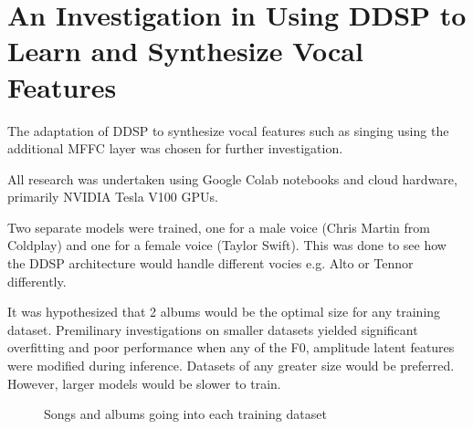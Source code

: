 \chapter{An Investigation in Using DDSP to Learn and Synthesize Vocal Features}

The adaptation of DDSP to synthesize vocal features such as singing using the additional MFFC layer was chosen for further investigation.

All research was undertaken using Google Colab notebooks and cloud hardware, primarily NVIDIA Tesla V100 GPUs.

Two separate models were trained, one for a male voice (Chris Martin from Coldplay) and one for a female voice (Taylor Swift). This was done to see how the DDSP architecture would handle different vocies e.g. Alto or Tennor differently.

It was hypothesized that 2 albums would be the optimal size for any training dataset. Premilinary investigations on smaller datasets yielded significant overfitting and poor performance when any of the F0, amplitude latent features were modified during inference. Datasets of any greater size would be preferred. However, larger models would be slower to train.

\begin{figure}[!ht]
    \centering
    \caption{Songs and albums going into each training dataset}
\end{figure}





